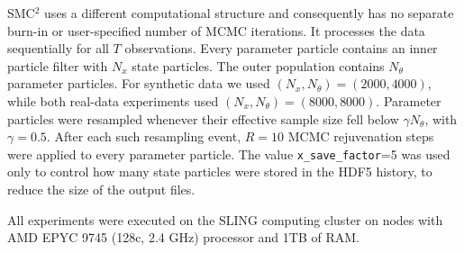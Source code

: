 SMC$^2$ uses a different computational structure and consequently has no
separate burn-in or user-specified number of MCMC iterations.  It processes
the data sequentially for all $T$ observations.  Every parameter particle
contains an inner particle filter with $N_x$ state particles.  The outer
population contains $N_\theta$ parameter particles.  For synthetic data we
used $(N_x,N_\theta)=(2000,4000)$, while both real-data experiments used
$(N_x,N_\theta)=(8000,8000)$.  Parameter particles were resampled whenever
their effective sample size fell below $\gamma N_\theta$, with
$\gamma=0.5$.  After each such resampling event, $R=10$ MCMC rejuvenation
steps were applied to every parameter particle. The value
\texttt{x\_save\_factor}=5 was used only to control how many state particles
were stored in the HDF5 history, to reduce the size of the output files.

All experiments were executed on the SLING computing cluster on nodes with AMD EPYC 9745 (128c, 2.4 GHz) processor and 1TB of RAM.